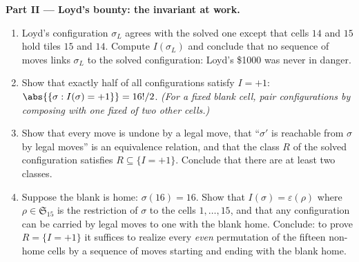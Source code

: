 \begin{problem}
\medskip
\noindent\textbf{Part II --- Loyd's bounty: the invariant at
work.}
\begin{enumerate}[resume]
  \item Loyd's configuration $\sigma_L$ agrees with the solved one
        except that cells $14$ and $15$ hold tiles $15$ and $14$.
        Compute $I(\sigma_L)$ and conclude that no sequence of
        moves links $\sigma_L$ to the solved configuration:
        Loyd's \$1000 was never in danger.
  \item Show that exactly half of all configurations satisfy $I =
        +1$: $\abs{\{\sigma : I(\sigma) = +1\}} = 16!/2$.
        \emph{(For a fixed blank cell, pair configurations by
        composing with one fixed  of two other
        cells.)}
  \item Show that every move is undone by a legal move, that
        ``$\sigma'$ is reachable from $\sigma$ by legal moves'' is
        an equivalence relation, and that the class $R$ of the
        solved configuration satisfies $R \subseteq \{I = +1\}$.
        Conclude that there are at least two classes.
  \item Suppose the blank is home: $\sigma(16) = 16$. Show that
        $I(\sigma) = \varepsilon(\rho)$ where $\rho \in
        \mathfrak{S}_{15}$ is the restriction of $\sigma$ to the
        cells $1, \dots, 15$, and that any configuration can be
        carried by legal moves to one with the blank home.
        Conclude: to prove $R = \{I = +1\}$ it suffices to realize
        every \emph{even} permutation of the fifteen non-home
        cells by a sequence of moves starting and ending with the
        blank home.
\end{enumerate}


\end{problem}
